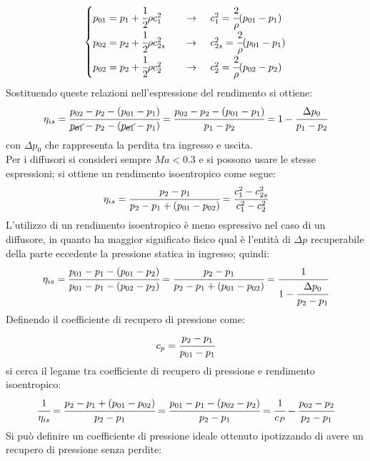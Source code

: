 \begin{align*}
\begin{cases}
p_{01} = p_1 + \cfrac{1}{2} \rho c_1^2 \;\;\;\;& \to  \;\;\;\; c_1^2 = \cfrac{2}{\rho} (p_{01} - p_1)\\
p_{02} = p_2 + \cfrac{1}{2} \rho c_{2s}^2 \;\;\;\;& \to  \;\;\;\; c_{2s}^2 = \cfrac{2}{\rho} (p_{01} - p_1)\\
p_{02} = p_2 + \cfrac{1}{2} \rho c_2^2 \;\;\;\;& \to  \;\;\;\; c_2^2 = \cfrac{2}{\rho} (p_{02} - p_2)
\end{cases}
\end{align*}
Sostituendo queste relazioni nell'espressione del rendimento si ottiene:
\begin{align*}
\eta_{is} = \cfrac{p_{02} - p_2 - (p_{01} - p_1)}{\cancel{p_{01}} - p_2 - (\cancel{p_{01}} - p_1)}=\cfrac{p_{02} - p_2 -(p_{01} - p_1)}{p_1-p_2}=1- \cfrac{\Delta p_0}{p_1 - p_2}
\end{align*}
con $\Delta p_0$ che rappresenta la perdita tra ingresso e uscita.\\
Per i diffusori si consideri sempre $Ma<0.3$ e si possono usare le stesse espressioni; si ottiene un rendimento isoentropico come segue:
\begin{align*}
\eta_{is} = \cfrac{p_2 - p_1}{p_2-p_1 + (p_{01}-p_{02})} = \cfrac{c_1^2 - c_{2s}^2}{c_1^2 - c_2^2}
\end{align*}
L'utilizzo di un rendimento isoentropico è meno espressivo nel caso di un diffusore, in quanto ha maggior significato fisico qual è l'entità di $ \Delta p$ recuperabile della parte eccedente la pressione statica in ingresso; quindi:
\begin{align*}
\eta_{is} = \cfrac{p_{01} - p_1 - (p_{01} - p_2)}{p_{01} - p_1-(p_{02} - p_2)} = \cfrac{p_2 - p_1}{p_2 - p_1 + (p_{01} - p_{02})} = \cfrac{1}{1- \cfrac{\Delta p_0}{p_2 - p_1}}
\end{align*}
Definendo il coefficiente di recupero di pressione come:
\begin{align*}
c_p = \cfrac{p_2 - p_1}{p_{01} - p_1}
\end{align*}
si cerca il legame tra coefficiente di recupero di pressione e rendimento isoentropico:
\begin{align*}
\cfrac{1}{\eta_{is}} = \cfrac{p_2 - p_1 + (p_{01} - p_{02})}{p_2 - p_1} = \cfrac{p_{01} - p_1 - (p_{02} - p_2)}{p_2-p_1} = \cfrac{1}{c_P} - \cfrac{p_{02} - p_2}{p_2 - p_1}
\end{align*}
Si può definire un coefficiente di pressione ideale ottenuto ipotizzando di avere un recupero di pressione senza perdite:
